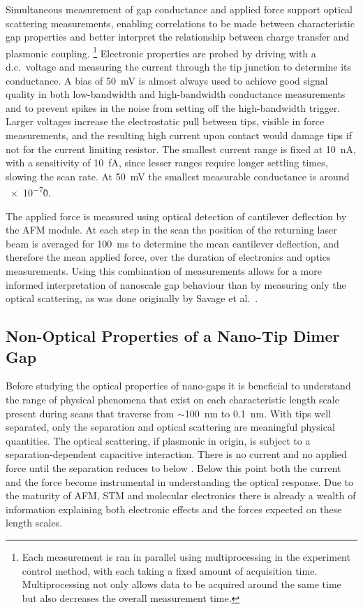 \documentclass[a4paper]{article}
\begin{document}
Simultaneous measurement of gap conductance and applied force support optical scattering measurements, enabling correlations to be made between characteristic gap properties and better interpret the relationship between charge transfer and plasmonic coupling.%
\footnote{Each measurement is ran in parallel using multiprocessing in the experiment control method, with each taking a fixed amount of acquisition time. Multiprocessing not only allows data to be acquired around the same time but also decreases the overall measurement time.}
Electronic properties are probed by driving with a d.c.\ voltage and measuring the current through the tip junction to determine its conductance. A bias of \SI{50}{mV} is almost always used to achieve good signal quality in both low-bandwidth and high-bandwidth conductance measurements and to prevent spikes in the noise from setting off the high-bandwidth trigger. Larger voltages increase the electrostatic pull between tips, visible in force measurements, and the resulting high current upon contact would damage tips if not for the current limiting resistor. The smallest current range is fixed at \SI{10}{nA}, with a sensitivity of \SI{10}{fA}, since lesser ranges require longer settling times, slowing the scan rate. At \SI{50}{mV} the smallest measurable conductance is around \num{e-7}\G0.

The applied force is measured using optical detection of cantilever deflection by the AFM module. At each step in the scan the position of the returning laser beam is averaged for \SI{100}{ms} to determine the mean cantilever deflection, and therefore the mean applied force, over the duration of electronics and optics measurements.
Using this combination of measurements allows for a more informed interpretation of nanoscale gap behaviour than by measuring only the optical scattering, as was done originally by Savage et al.\ \cite{savage2012}.

\subsection{Non-Optical Properties of a Nano-Tip Dimer Gap}

Before studying the optical properties of nano-gaps it is beneficial to understand the range of physical phenomena that exist on each characteristic length scale present during scans that traverse from $\sim$\SI{100}{nm} to \SI{0.1}{nm}. With tips well separated, only the separation and optical scattering are meaningful physical quantities. The optical scattering, if plasmonic in origin, is subject to a separation-dependent capacitive interaction. There is no current and no applied force until the separation reduces to below . Below this point both the current and the force become instrumental in understanding the optical response. Due to the maturity of AFM, STM and molecular electronics there is already a wealth of information explaining both electronic effects and the forces expected on these length scales.
\end{document}
